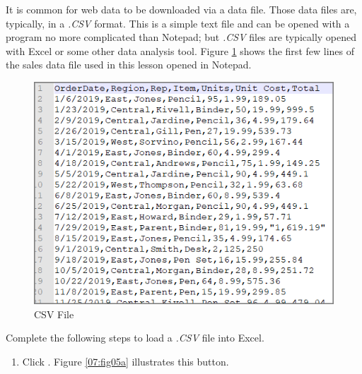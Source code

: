 It is common for web data to be downloaded via a data file. Those data files are, typically, in a \textit{.CSV} format. This is a simple text file and can be opened with a program no more complicated than Notepad; but \textit{.CSV} files are typically opened with Excel or some other data analysis tool. Figure \ref{07:fig04} shows the first few lines of the sales data file used in this lesson opened in Notepad.

\begin{figure}[H]
	\centering
	\includegraphics[width=\maxwidth{.95\linewidth}]{gfx/ch07_fig04}
	\caption{CSV File}
	\label{07:fig04}
\end{figure}

Complete the following steps to load a \textit{.CSV} file into Excel.

\begin{enumerate}
	\item Click .
	Figure \ref{07:fig05a} illustrates this button.
\end{enumerate}

